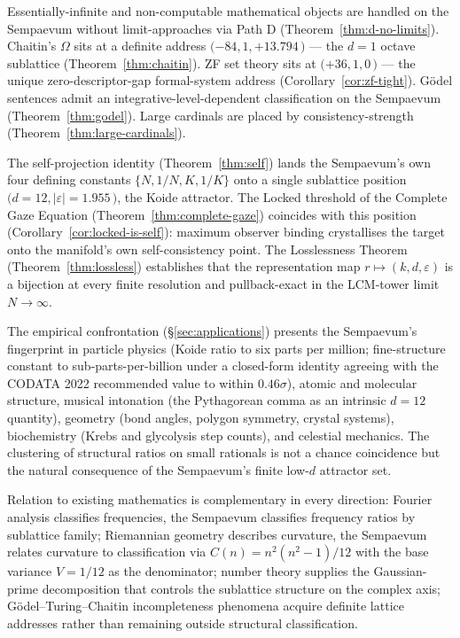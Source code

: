 \documentclass[11pt,a4paper]{article}
\theoremstyle{definition}
\theoremstyle{remark}
\begin{document}
Essentially-infinite and non-computable mathematical objects are handled on the Sempaevum without limit-approaches via Path D (Theorem~\ref{thm:d-no-limits}). Chaitin's $\Omega$ sits at a definite address $(-84, 1, +13.794$\,\textcent$)$ --- the $d=1$ octave sublattice (Theorem~\ref{thm:chaitin}). ZF set theory sits at $(+36, 1, 0$\,\textcent$)$ --- the unique zero-descriptor-gap formal-system address (Corollary~\ref{cor:zf-tight}). G\"odel sentences admit an integrative-level-dependent classification on the Sempaevum (Theorem~\ref{thm:godel}). Large cardinals are placed by consistency-strength (Theorem~\ref{thm:large-cardinals}).

The self-projection identity (Theorem~\ref{thm:self}) lands the Sempaevum's own four defining constants $\{N, 1/N, K, 1/K\}$ onto a single sublattice position $(d=12, |\varepsilon|=1.955$\,\textcent$)$, the Koide attractor. The Locked threshold of the Complete Gaze Equation (Theorem~\ref{thm:complete-gaze}) coincides with this position (Corollary~\ref{cor:locked-is-self}): maximum observer binding crystallises the target onto the manifold's own self-consistency point. The Losslessness Theorem (Theorem~\ref{thm:lossless}) establishes that the representation map $r\mapsto(k,d,\varepsilon)$ is a bijection at every finite resolution and pullback-exact in the LCM-tower limit $N\to\infty$.

The empirical confrontation (\S\ref{sec:applications}) presents the Sempaevum's fingerprint in particle physics (Koide ratio to six parts per million; fine-structure constant to sub-parts-per-billion under a closed-form identity agreeing with the CODATA 2022 recommended value to within $0.46\sigma$), atomic and molecular structure, musical intonation (the Pythagorean comma as an intrinsic $d=12$ quantity), geometry (bond angles, polygon symmetry, crystal systems), biochemistry (Krebs and glycolysis step counts), and celestial mechanics. The clustering of structural ratios on small rationals is not a chance coincidence but the natural consequence of the Sempaevum's finite low-$d$ attractor set.

Relation to existing mathematics is complementary in every direction: Fourier analysis classifies frequencies, the Sempaevum classifies frequency ratios by sublattice family; Riemannian geometry describes curvature, the Sempaevum relates curvature to classification via $C(n)=n^{2}(n^{2}-1)/12$ with the base variance $V=1/12$ as the denominator; number theory supplies the Gaussian-prime decomposition that controls the sublattice structure on the complex axis; G\"odel--Turing--Chaitin incompleteness phenomena acquire definite lattice addresses rather than remaining outside structural classification.
\end{document}
